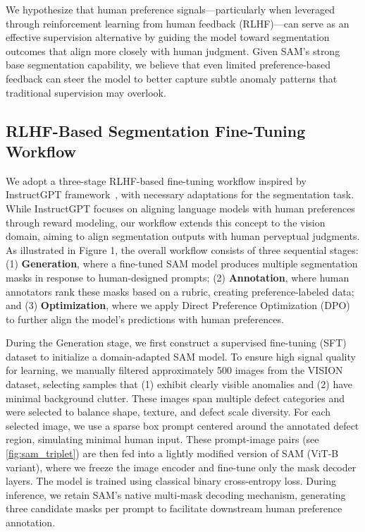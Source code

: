 \documentclass[11pt]{article}
\begin{document}
We hypothesize that human preference signals—particularly when leveraged through reinforcement learning from human feedback (RLHF)—can serve as an effective supervision alternative by guiding the model toward segmentation outcomes that align more closely with human judgment. Given SAM’s strong base segmentation capability, we believe that even limited preference-based feedback can steer the model to better capture subtle anomaly patterns that traditional supervision may overlook.

\subsection{RLHF-Based Segmentation Fine-Tuning Workflow}
We adopt a three-stage RLHF-based fine-tuning workflow inspired by InstructGPT framework~\cite{ouyang2022traininglanguagemodelsfollow}, with necessary adaptations for the segmentation task. While InstructGPT focuses on aligning language models with human preferences through reward modeling, our workflow extends this concept to the vision domain, aiming to align segmentation outputs with human perveptual judgments. As illustrated in Figure 1, the overall workflow consists of three sequential stages: (1) \textbf{Generation}, where a fine-tuned SAM model produces multiple segmentation masks in response to human-designed prompts; (2) \textbf{Annotation}, where human annotators rank these masks based on a rubric, creating preference-labeled data; and (3) \textbf{Optimization}, where we apply Direct Preference Optimization (DPO) to further align the model’s predictions with human preferences.

During the Generation stage, we first construct a supervised fine-tuning (SFT) dataset to initialize a domain-adapted SAM model. To ensure high signal quality for learning, we manually filtered approximately 500 images from the VISION dataset, selecting samples that (1) exhibit clearly visible anomalies and (2) have minimal background clutter. These images span multiple defect categories and were selected to balance shape, texture, and defect scale diversity. For each selected image, we use a sparse box prompt centered around the annotated defect region, simulating minimal human input. These prompt-image pairs (see \autoref{fig:sam_triplet}) are then fed into a lightly modified version of SAM (ViT-B variant), where we freeze the image encoder and fine-tune only the mask decoder layers. The model is trained using classical binary cross-entropy loss. During inference, we retain SAM’s native multi-mask decoding mechanism, generating three candidate masks per prompt to facilitate downstream human preference annotation.
\end{document}
